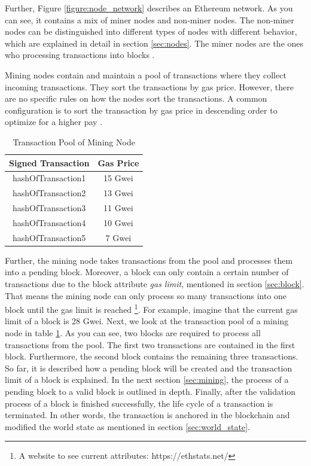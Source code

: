 Further, Figure \ref{figure:node_network} describes an Ethereum network. 
As you can see, it contains a mix of miner nodes and non-miner nodes. 
The non-miner nodes can be distinguished into different types of nodes with different 
behavior, which are explained in detail in section \ref{sec:nodes}. 
The miner nodes are the ones who processing transactions into blocks . 

Mining nodes contain and maintain a pool of transactions where they collect incoming transactions. 
They sort the transactions by gas price. 
However, there are no specific rules on how the nodes sort the transactions. 
A common configuration is to sort the transaction by gas price in descending order to 
optimize for a higher pay .

\begin{longtable}{c|c}
	\caption{Transaction Pool of Mining Node} 
	\label{table:sorted_gas_prices}
	\\
	\textbf{Signed Transaction} & \textbf{Gas Price} \\
	\hline
	hashOfTransaction1 & 15 Gwei \\
	hashOfTransaction2 & 13 Gwei \\
	hashOfTransaction3 & 11 Gwei \\
	hashOfTransaction4 & 10 Gwei \\
	hashOfTransaction5 & 7 Gwei \\
\end{longtable} 

Further, the mining node takes transactions from the pool and processes them into a pending block. 
Moreover, a block can only contain a certain number of transactions due to the block 
attribute \textit{gas limit}, mentioned in section \ref{sec:block}. 
That means the mining node can only process so many transactions into one 
block until the gas limit is reached \footnote{A website to see 
current attributes: https://ethstats.net/}. For example, 
imagine that the current gas limit of a block is 28 Gwei. 
Next, we look at the transaction pool of a mining node in 
table \ref{table:sorted_gas_prices}. As you can see, two blocks are 
required to process all transactions from the pool. The first two transactions 
are contained in the first block. Furthermore, the second block contains the remaining 
three transactions. 
So far, it is described how a pending block will be created and the transaction 
limit of a block is explained. In the next section \ref{sec:mining}, 
the process of a pending block to a valid block is outlined in depth. 
Finally, after the validation process of a block is finished successfully, 
the life cycle of a transaction is terminated. In other words, the transaction is anchored 
in the blockchain and modified the world state as mentioned in section \ref{sec:world_state}.


